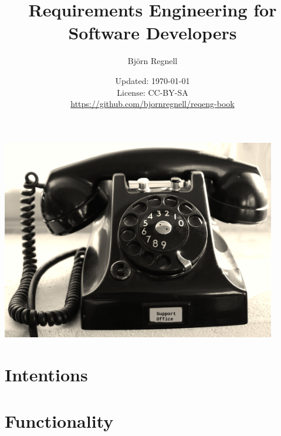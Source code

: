 \documentclass{reqengbook}
\title{
\bf\sffamily\fontsize{22}{28}\selectfont
Requirements Engineering for Software Developers
}
\author{\sffamily\fontsize{20}{30}\selectfont Björn Regnell}
\date{\vspace{2em}\sffamily\small Updated: \today 
\\ License: CC-BY-SA 
\\ \url{https://github.com/bjornregnell/reqeng-book} 
}
\begin{document}

\begin{minipage}{0.5\textwidth}
  \maketitle%
\end{minipage}%
\begin{minipage}{0.5\textwidth}
  \centering\vspace{2.2cm}
  \includegraphics[width=0.9\textwidth]{../img/phone-support.jpg}%
\end{minipage}%
\pagebreak

\setcounter{tocdepth}{2}

\begin{multicols*}{3}  %
\fontsize{8.4}{11}\selectfont

\tableofcontents
\end{multicols*}


\part{Intentions}





\part{Functionality}




\end{document}
